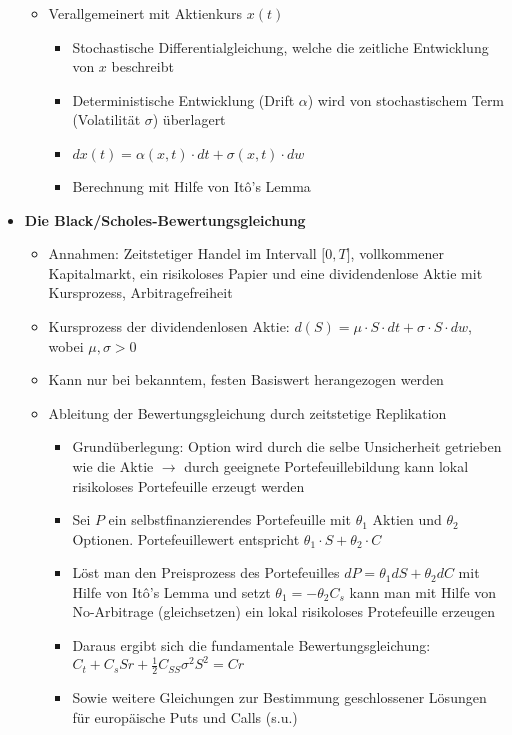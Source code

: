 \begin{itemize}
\begin{itemize}
		\item Verallgemeinert mit Aktienkurs \(x(t)\)
		\begin{itemize}
			\item Stochastische Differentialgleichung, welche die zeitliche Entwicklung von \(x\) beschreibt
			\item Deterministische Entwicklung (Drift \(\alpha\)) wird von stochastischem Term (Volatilität \(\sigma\)) überlagert
			\item \(dx(t) = \alpha(x,t)\cdot dt + \sigma(x,t)\cdot dw\)
			\item Berechnung mit Hilfe von Itô's Lemma
		\end{itemize}
	\end{itemize}
	\item \textbf{Die Black/Scholes-Bewertungsgleichung}
	\begin{itemize}
		\item Annahmen: Zeitstetiger Handel im Intervall \(\lbrack 0,T\rbrack\), vollkommener Kapitalmarkt, ein risikoloses Papier und eine dividendenlose Aktie mit Kursprozess, Arbitragefreiheit
		\item Kursprozess der dividendenlosen Aktie: \(d(S) = \mu \cdot S \cdot dt + \sigma \cdot S \cdot dw\), wobei \(\mu,\sigma > 0\)
		\item Kann nur bei bekanntem, festen Basiswert herangezogen werden
		\item Ableitung der Bewertungsgleichung durch zeitstetige Replikation
		\begin{itemize}
			\item Grundüberlegung: Option wird durch die selbe Unsicherheit getrieben wie die Aktie \(\rightarrow\) durch geeignete Portefeuillebildung kann lokal risikoloses Portefeuille erzeugt werden
			\item Sei \(P\) ein selbstfinanzierendes Portefeuille mit \(\theta_1\) Aktien und \(\theta_2\) Optionen. Portefeuillewert entspricht \(\theta_1 \cdot S + \theta_2 \cdot C\)
			\item Löst man den Preisprozess des Portefeuilles \(dP = \theta_1dS + \theta_2dC\) mit Hilfe von Itô's Lemma und setzt \(\theta_1 = -\theta_2C_s\) kann man mit Hilfe von No-Arbitrage (gleichsetzen) ein lokal risikoloses Protefeuille erzeugen
			\item Daraus ergibt sich die fundamentale Bewertungsgleichung: \(C_t + C_sSr + \frac{1}{2}C_{SS}\sigma^2S^2 = Cr\)
			\item Sowie weitere Gleichungen zur Bestimmung geschlossener Lösungen für europäische Puts und Calls (s.u.)
		\end{itemize}
	\end{itemize}
\end{itemize}


